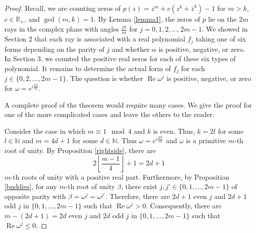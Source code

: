 \documentclass{amsart}
\renewcommand{\Re}{\operatorname{Re}}
\theoremstyle{definition}
\theoremstyle{remark}
\begin{document}
\begin{proof}
Recall, we are counting zeros of $p(z) = z^m+c(z^k+\overline{z}^k)-1$ for $m > k$, $c \in \mathbb{R_+}$, and $\gcd(m,k) = 1$.  By Lemma \ref{lemma1}, the zeros of $p$ lie on the $2m$ rays in the complex plane with angles $\frac{j\pi}{m}$ for $j = 0,1,2,...,2m-1$. We showed in Section 2 that each ray is associated with a real polynomial $f_j$ taking one of six forms depending on the parity of $j$ and whether $\alpha$ is positive, negative, or zero. In Section 3, we counted the positive real zeros for each of these six types of polynomial. It remains to determine the actual form of $f_j$ for each $j \in \{0,2,\ldots, 2m-1\}$. The question is whether $\Re \omega^j$ is positive, negative, or zero for $\omega = e^{i\frac{k \pi}{m}}$. 

A complete proof of the theorem would require many cases. We give the proof for one of the more complicated cases and leave the others to the reader.

Consider the case in which $m \equiv 1 \mod 4$ and $k$ is even. Thus, $k = 2l$ for some $l \in \mathbb{N}$ and $m=4d+1$ for some $d \in \mathbb{N}$. Thus $\omega = e^{i\frac{2l\pi}{m}}$ and $\omega$ is a primitive $m$-th root of unity. By Proposition \ref{rightside}, there are 
\[
2\left\lfloor\frac{m-1}{4}\right\rfloor + 1 = 2d+1 
\]
$m$-th roots of unity with a positive real part. Furthermore, by Proposition \ref{buddies}, for any $m$-th root of unity $\beta$, there exist $j,j' \in \{0, 1, \ldots, 2m-1\}$ of opposite parity with $\beta  = \omega^j = \omega^{j'}$. Therefore, there are $2d+1$ even $j$ and $2d+1$ odd $j$ in $\{0,1,\ldots,2m-1\}$ such that $\Re \omega^j > 0$. Consequently, there are $m-(2d+1)=2d$ even $j$ and $2d$ odd $j$ in $\{0,1,\ldots,2m-1\}$ such that $\Re \omega^j \leq 0$.   






\end{proof}
\end{document}
